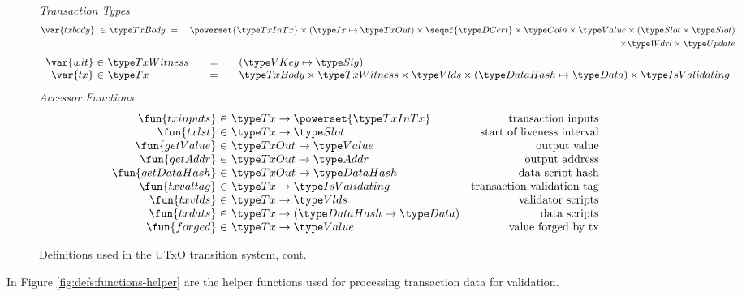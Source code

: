\begin{figure*}[htb]
  \emph{Transaction Types}
  \begin{align*}
    \var{txbody} ~\in~
    & \TxBody ~=~
    & \powerset{\TxInTx} \times (\Ix \mapsto \TxOut) \times \seqof{\DCert}
      \times \Coin \times \Value \times (\Slot\times\Slot) \\
    & ~& \times \Wdrl \times \Update
  \end{align*}
  \begin{equation*}
    \begin{array}{r@{~\in~}l@{\qquad=\qquad}l}
      \var{wit} & \TxWitness & (\VKey \mapsto \Sig)
      \\
      \var{tx}
      & \Tx
      & \TxBody \times \TxWitness \times \Vlds \times (\HashDat \mapsto \Data) \times \IsValidating
    \end{array}
  \end{equation*}
  \emph{Accessor Functions}
  \begin{equation*}
    \begin{array}{r@{~\in~}lr}
      \fun{txinputs} & \Tx \to \powerset{\TxInTx} & \text{transaction inputs} \\
      \fun{txlst} & \Tx \to \Slot & \text{start of liveness interval} \\
      \fun{getValue} & \TxOut \to \Value & \text{output value} \\
      \fun{getAddr} & \TxOut \to \Addr & \text{output address} \\
      \fun{getDataHash} & \TxOut \to \HashDat & \text{data script hash} \\
      \fun{txvaltag} & \Tx \to \IsValidating & \text{transaction validation tag}\\
      \fun{txvlds} & \Tx \to \Vlds & \text{validator scripts}\\
      \fun{txdats} & \Tx \to (\HashDat \mapsto \Data) & \text{data scripts}\\
      \fun{forged} & \Tx \to \Value & \text{value forged by tx}\\
    \end{array}
  \end{equation*}
  \caption{Definitions used in the UTxO transition system, cont.}
  \label{fig:defs:utxo-shelley-2}
\end{figure*}


In Figure \ref{fig:defs:functions-helper} are the helper functions used for
processing transaction data for validation.

